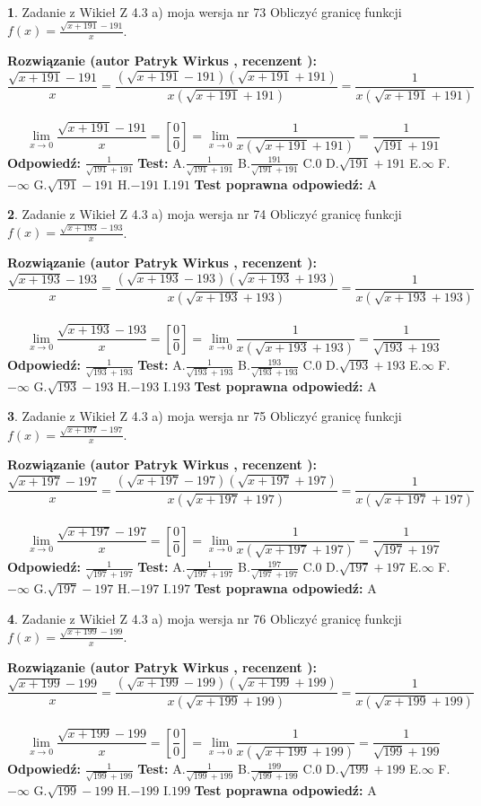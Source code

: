 \documentclass[12pt, a4paper]{article}
\theoremstyle{definition} %
\newtheorem{zad}{}
\newcommand{\zadStart}[1]{\begin{zad}#1\newline}
\newcommand{\zadStop}{\end{zad}}
\newcommand{\rozwStart}[2]{\noindent \textbf{Rozwiązanie (autor #1 , recenzent #2): }\newline}
\newcommand{\rozwStop}{\newline}
\newcommand{\odpStart}{\noindent \textbf{Odpowiedź:}\newline}
\newcommand{\odpStop}{\newline}
\newcommand{\testStart}{\noindent \textbf{Test:}\newline}
\newcommand{\testStop}{\newline}
\newcommand{\kluczStart}{\noindent \textbf{Test poprawna odpowiedź:}\newline}
\newcommand{\kluczStop}{\newline}
\begin{document}
\zadStart{Zadanie z Wikieł Z 4.3 a) moja wersja nr 73}
Obliczyć granicę funkcji $f(x)=\frac{\sqrt{x+191}-191}{x}$.
\zadStop
\rozwStart{Patryk Wirkus}{}
$$\frac{\sqrt{x+191}-191}{x}=\frac{(\sqrt{x+191}-191)(\sqrt{x+191}+191)}{x(\sqrt{x+191}+191)}=\frac{1}{x(\sqrt{x+191}+191)}$$
\\
$$\lim\limits_{x\to0}\frac{\sqrt{x+191}-191}{x}=[\frac{0}{0}]=
\lim\limits_{x\to0}\frac{1}{x(\sqrt{x+191}+191)} = \frac{1}{\sqrt{191}+191}$$
\rozwStop
\odpStart
$\frac{1}{\sqrt{191}+191}$
\odpStop
\testStart
A.$\frac{1}{\sqrt{191}+191}$
B.$\frac{191}{\sqrt{191}+191}$
C.$0$
D.$\sqrt{191}+191$
E.$\infty$
F.$-\infty$
G.$\sqrt{191}-191$
H.$-191$
I.$191$
\testStop
\kluczStart
A
\kluczStop



\zadStart{Zadanie z Wikieł Z 4.3 a) moja wersja nr 74}
Obliczyć granicę funkcji $f(x)=\frac{\sqrt{x+193}-193}{x}$.
\zadStop
\rozwStart{Patryk Wirkus}{}
$$\frac{\sqrt{x+193}-193}{x}=\frac{(\sqrt{x+193}-193)(\sqrt{x+193}+193)}{x(\sqrt{x+193}+193)}=\frac{1}{x(\sqrt{x+193}+193)}$$
\\
$$\lim\limits_{x\to0}\frac{\sqrt{x+193}-193}{x}=[\frac{0}{0}]=
\lim\limits_{x\to0}\frac{1}{x(\sqrt{x+193}+193)} = \frac{1}{\sqrt{193}+193}$$
\rozwStop
\odpStart
$\frac{1}{\sqrt{193}+193}$
\odpStop
\testStart
A.$\frac{1}{\sqrt{193}+193}$
B.$\frac{193}{\sqrt{193}+193}$
C.$0$
D.$\sqrt{193}+193$
E.$\infty$
F.$-\infty$
G.$\sqrt{193}-193$
H.$-193$
I.$193$
\testStop
\kluczStart
A
\kluczStop



\zadStart{Zadanie z Wikieł Z 4.3 a) moja wersja nr 75}
Obliczyć granicę funkcji $f(x)=\frac{\sqrt{x+197}-197}{x}$.
\zadStop
\rozwStart{Patryk Wirkus}{}
$$\frac{\sqrt{x+197}-197}{x}=\frac{(\sqrt{x+197}-197)(\sqrt{x+197}+197)}{x(\sqrt{x+197}+197)}=\frac{1}{x(\sqrt{x+197}+197)}$$
\\
$$\lim\limits_{x\to0}\frac{\sqrt{x+197}-197}{x}=[\frac{0}{0}]=
\lim\limits_{x\to0}\frac{1}{x(\sqrt{x+197}+197)} = \frac{1}{\sqrt{197}+197}$$
\rozwStop
\odpStart
$\frac{1}{\sqrt{197}+197}$
\odpStop
\testStart
A.$\frac{1}{\sqrt{197}+197}$
B.$\frac{197}{\sqrt{197}+197}$
C.$0$
D.$\sqrt{197}+197$
E.$\infty$
F.$-\infty$
G.$\sqrt{197}-197$
H.$-197$
I.$197$
\testStop
\kluczStart
A
\kluczStop



\zadStart{Zadanie z Wikieł Z 4.3 a) moja wersja nr 76}
Obliczyć granicę funkcji $f(x)=\frac{\sqrt{x+199}-199}{x}$.
\zadStop
\rozwStart{Patryk Wirkus}{}
$$\frac{\sqrt{x+199}-199}{x}=\frac{(\sqrt{x+199}-199)(\sqrt{x+199}+199)}{x(\sqrt{x+199}+199)}=\frac{1}{x(\sqrt{x+199}+199)}$$
\\
$$\lim\limits_{x\to0}\frac{\sqrt{x+199}-199}{x}=[\frac{0}{0}]=
\lim\limits_{x\to0}\frac{1}{x(\sqrt{x+199}+199)} = \frac{1}{\sqrt{199}+199}$$
\rozwStop
\odpStart
$\frac{1}{\sqrt{199}+199}$
\odpStop
\testStart
A.$\frac{1}{\sqrt{199}+199}$
B.$\frac{199}{\sqrt{199}+199}$
C.$0$
D.$\sqrt{199}+199$
E.$\infty$
F.$-\infty$
G.$\sqrt{199}-199$
H.$-199$
I.$199$
\testStop
\kluczStart
A
\kluczStop
\end{document}

